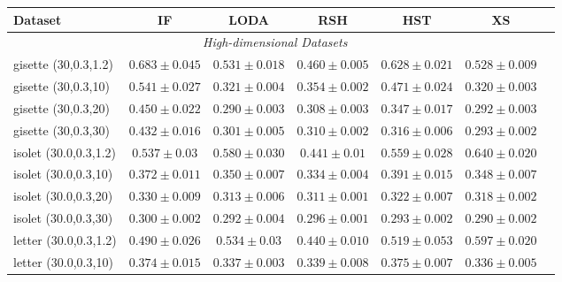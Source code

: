 \begin{footnotesize}
\begin{table}[p!]
		\begin{tabular}{lcccccc}
				\toprule
				\textbf{Dataset} & \textbf{IF} &  \textbf{LODA} & \textbf{RSH} &  \textbf{HST}  & \textbf{XS}\\
				\midrule
				\multicolumn{6}{c}{\textit{High-dimensional Datasets}}\\
gisette (30,0.3,1.2)  & $0.683 \pm 0.045$ &  $0.531 \pm 0.018$ &  $0.460 \pm 0.005$ &  $0.628 \pm 0.021$  & $0.528 \pm  0.009$ \\
gisette (30,0.3,10)   & $0.541 \pm 0.027$ &  $0.321 \pm 0.004$ &  $0.354 \pm 0.002$ &  $0.471 \pm 0.024$  & $0.320 \pm  0.003$   \\
gisette (30,0.3,20)   & $0.450 \pm 0.022$ &  $0.290 \pm 0.003$ &  $0.308 \pm 0.003$ &  $0.347 \pm 0.017$  & $0.292 \pm  0.003$  \\
gisette (30,0.3,30)   & $0.432 \pm 0.016$ &  $0.301 \pm 0.005$ &  $0.310 \pm 0.002$ &  $0.316 \pm 0.006$  & $0.293 \pm  0.002$  \\
\midrule
isolet (30.0,0.3,1.2) & $0.537 \pm 0.03$  &  $0.580 \pm 0.030$ &  $0.441 \pm 0.01$  &  $0.559 \pm 0.028$  & $0.640 \pm  0.020$   \\
isolet (30.0,0.3,10)  & $0.372 \pm 0.011$ &  $0.350 \pm 0.007$ &  $0.334 \pm 0.004$ &  $0.391 \pm 0.015$  & $0.348 \pm  0.007$  \\
isolet (30.0,0.3,20)  & $0.330 \pm 0.009$ &  $0.313 \pm 0.006$ &  $0.311 \pm 0.001$ &  $0.322 \pm 0.007$  & $0.318 \pm  0.002$   \\
isolet (30.0,0.3,30)  & $0.300 \pm 0.002$ &  $0.292 \pm 0.004$ &  $0.296 \pm 0.001$ &  $0.293 \pm 0.002$  & $0.290 \pm  0.002$  \\
\midrule
letter (30.0,0.3,1.2) & $0.490 \pm 0.026$ &  $0.534 \pm 0.03$  &  $0.440 \pm 0.010$ &  $0.519 \pm 0.053$ & $0.597 \pm  0.020$   \\
letter (30.0,0.3,10)  & $0.374 \pm 0.015$ &  $0.337 \pm 0.003$ &  $0.339 \pm 0.008$ &  $0.375 \pm 0.007$ & $0.336 \pm  0.005$   \\

\end{tabular}
\end{table}
\end{footnotesize}
